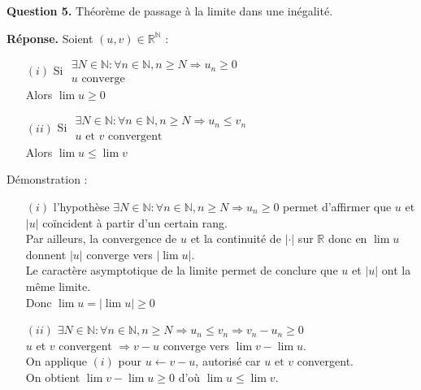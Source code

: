 \documentclass{article}
\newcommand{\N}{\ensuremath{\mathbb N} }
\newcommand{\R}{\ensuremath{\mathbb R} }
\begin{document}
\text{ }
\newline\newline
\textbf{Question 5.} Théorème de passage à la limite dans une inégalité.
\newline

\textbf{Réponse. } Soient $(u,v) \in \R^{\N}$ : \\
\begin{itemize}
    \item[$(i)$] Si $\begin{array}{|l}
       \exists N \in \N : \forall n \in \N, n \geqslant N \Rightarrow u_{n} \geqslant 0   \\
       u \text{ converge}
    \end{array}$ \\
    Alors $\lim u \geqslant 0$
    \item[$(ii)$] Si $\begin{array}{|l}
       \exists N \in \N : \forall n \in \N, n \geqslant N \Rightarrow u_{n} \leqslant v_{n}   \\
       u \text{ et } v \text{ convergent}
    \end{array}$ \\
    Alors $\lim u \leqslant \lim v$
\end{itemize}

Démonstration : 
\begin{itemize}
    \item[$(i)$] l'hypothèse $\exists N \in \N : \forall n \in \N, n \geqslant N \Rightarrow u_{n} \geqslant 0$ permet d'affirmer que $u$ et $|u|$ coïncident à partir d'un certain rang. \\
    Par ailleurs, la convergence de $u$ et la continuité de $|\cdot|$ sur $\R$ donc en $\lim u$ donnent $|u|$ converge vers $|\lim u|$. \\
    Le caractère asymptotique de la limite permet de conclure que $u$ et $|u|$ ont la même limite. \\
    Donc $\lim u = |\lim u| \geqslant 0$
    \item[$(ii)$] $\exists N \in \N : \forall n \in \N, n \geqslant N \Rightarrow u_{n} \leqslant v_{n} \Rightarrow v_{n} - u_{n} \geqslant 0$ \\
    $u$ et $v$ convergent $\Rightarrow v-u$ converge vers $\lim v - \lim u$. \\
    On applique $(i)$ pour $u \leftarrow v - u$, autorisé car $u \text{ et }v$ convergent. \\
    On obtient $\lim v - \lim u \geqslant 0$ d'où $\lim u \leqslant \lim v$.
\end{itemize}
\end{document}
